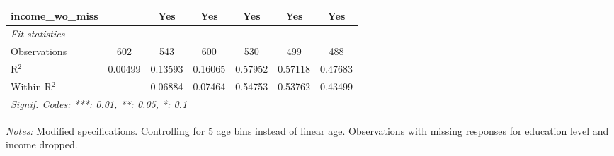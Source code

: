 \begin{tabular}{lcccccc}
   income\_wo\_miss                          &          & Yes           & Yes      & Yes           & Yes          & Yes\\  
   \midrule
   \emph{Fit statistics}\\
   Observations                              & 602      & 543           & 600      & 530           & 499          & 488\\  
   R$^2$                                     & 0.00499  & 0.13593       & 0.16065  & 0.57952       & 0.57118      & 0.47683\\  
   Within R$^2$                              &          & 0.06884       & 0.07464  & 0.54753       & 0.53762      & 0.43499\\  
   \midrule \midrule
   \multicolumn{7}{l}{\emph{Signif. Codes: ***: 0.01, **: 0.05, *: 0.1}}\\
\end{tabular}
 
\par \raggedright 
\textit{Notes:} Modified specifications. Controlling for 5 age bins instead of linear age. Observations with missing responses for education level and income dropped.
\par\endgroup


